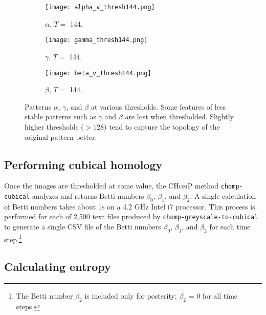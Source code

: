 \begin{figure}[h]
        \begin{subfigure}[b]{0.25\textwidth}
                \texttt{[image: alpha\_v\_thresh144.png]}
                \caption{$\alpha$, $T =$ 144.}
                \label{fig:alpha_144}
        \end{subfigure} \quad
         \begin{subfigure}[b]{0.25\textwidth}
                \texttt{[image: gamma\_thresh144.png]}
                \caption{$\gamma$, $T =$ 144.}
                \label{fig:gamma_144}
        \end{subfigure} \quad
         \begin{subfigure}[b]{0.25\textwidth}
                \texttt{[image: beta\_v\_thresh144.png]}
                \caption{$\beta$, $T =$ 144.}
                \label{fig:beta_144}
        \end{subfigure} \hfill
        \caption{Patterns $\alpha$, $\gamma$, and $\beta$ at various thresholds. Some features of less stable patterns such as $\gamma$ and $\beta$ are lost when thresholded. Slightly higher thresholds ($>128$) tend to capture the topology of the original pattern better.}\label{fig:thresholds}
\end{figure}

\subsection{Performing cubical homology} \label{sect:chomping}

Once the images are thresholded at some value, the \textsc{CHomP} method \texttt{chomp-cubical} analyzes and returns Betti numbers $\beta_0$, $\beta_1$, and $\beta_2$.  A single calculation of Betti numbers takes about 1s on a 4.2 GHz Intel i7 processor. This process is performed for each of 2,500 text files produced by \texttt{chomp-greyscale-to-cubical} to generate a single CSV file of the Betti numbers $\beta_0$, $\beta_1$, and $\beta_2$ for each time step.\footnote{The Betti number $\beta_2$ is included only for posterity; $\beta_2$ = 0 for all time steps.}

\subsection{Calculating entropy} \label{sect:entropy}

